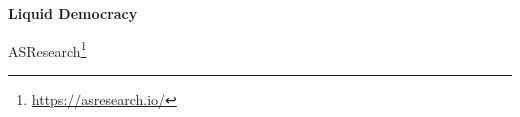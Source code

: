 \documentclass[12pt]{article}
\begin{document}
	\pagestyle{empty}

	\begin{center}
		\vspace*{1.5cm}
		\vspace{0.5cm}
		\textbf{\huge{Liquid Democracy}}

		\vspace{0.5cm}
    ASResearch\footnote{\url{https://asresearch.io/}}
		\textbf{}
	\end{center}


%





\end{document}
